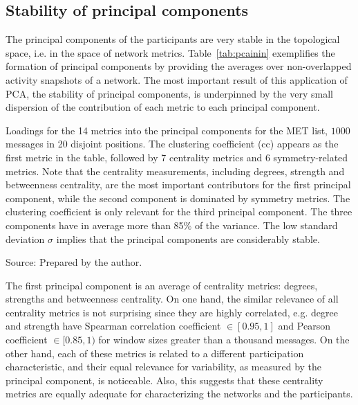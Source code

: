\subsection{Stability of principal components}\label{prevalence}

The principal components of the participants are very stable in the topological space,
i.e. in the space of network metrics.
Table~\ref{tab:pcainin} exemplifies the formation of principal components by providing the averages over non-overlapped activity snapshots of a network. The most important result of this application of PCA, the stability of principal components, is underpinned by the very small dispersion of the contribution of each metric to each principal component.

\begin{table}[!h]
\caption{Loadings for the 14 metrics into the principal components for the MET list, $1000$ messages in 20 disjoint positions. The clustering coefficient (cc) appears as the first metric in the table, followed by 7 centrality metrics and 6 symmetry-related metrics. Note that the centrality measurements, including degrees, strength and betweenness centrality, are the most important contributors for the first principal component, while the second component is dominated by symmetry metrics. The clustering coefficient is only relevant for the third principal component. The three components have in average more than 85\% of the variance.
The low standard deviation $\sigma$ implies that the principal components are considerably stable.}
\footnotesize

\label{tab:pcainin}
\begin{flushleft}
Source: Prepared by the author.\
\end{flushleft}
\end{table}

The first principal component is an average of centrality metrics:
degrees, strengths and betweenness centrality.
On one hand, the similar relevance of all centrality metrics is not surprising since they are highly correlated,
e.g. degree and strength have Spearman correlation coefficient $\in [0.95,1]$ 
and Pearson coefficient $\in [0.85,1)$ for window sizes greater than a thousand messages.
On the other hand, each of these metrics is related to a different participation characteristic,
and their equal relevance for variability,
as measured by the principal component, is noticeable.
Also, this suggests that these centrality metrics 
are equally adequate for characterizing the networks
and the participants.

